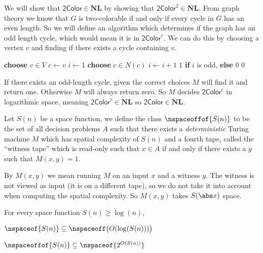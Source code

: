\documentclass[10pt]{article}
\def\twocolor{\mathsf{2Color}}
\def\NL{\mathbf{NL}}
\begin{document}
\begin{exam*}

    We will show that $\twocolor\in\NL$ by showing that $\twocolor^2\in\NL$.
    From graph theory we know that $G$ is two-colorable if and only if every cycle in $G$ has an even length.
    So we will define an algorithm which determines if the graph has an odd length cycle, which would mean it is in $\twocolor^c$.
    We can do this by choosing a vertex $v$ and finding if there exists a cycle containing $v$.

    \algorithm
            \State \textbf{choose} $v\in V$
            \State $c\gets v$
            \State $i\gets1$
                \State \textbf{choose} $c\in N(c)$
                \State $i\gets i+1$
                \Return $1$ \textbf{if} $i$ is odd, \textbf{else} $0$
            \EndWhile
            \State\Return $0$
        \EndFunc
    \ealgorithm

    If there exists an odd-length cycle, given the correct choices $M$ will find it and return one.
    Otherwise $M$ will always return zero.
    So $M$ decides $\twocolor^c$ in logarithmic space, meaning $\twocolor^c\in\NL$ so $\twocolor\in\NL$.

\end{exam*}

\begin{defn*}

    Let $S(n)$ be a space function, we define the class $\nspaceoffof{S(n)}$ to be the set of all decision problems $A$ such that there exists a \emph{deterministic} Turing machine $M$ which has spatial
    complexity of $S(n)$ and a fourth tape, called the ``witness tape'' which is read-only such that $x\in A$ if and only if there exists a $y$ such that $M(x,y)=1$.

    By $M(x,y)$ we mean running $M$ on an input $x$ and a witness $y$.
    The witness is not viewed as input (it is on a different tape), so we do not take it into account when computing the spatial complexity.
    So $M(x,y)$ takes $S(\abs x)$ space.

\end{defn*}

\begin{thrm*}

    For every space function $S(n)\geq\log(n)$,
    \benum
        \item $\nspaceof{S(n)}\subseteq\nspaceoff\bigl(O(\log(S(n)))\bigr)$
        \item $\nspaceoffof{S(n)}\subseteq\nspaceof{2^{O(S(n))}}$
    \eenum

\end{thrm*}
\end{document}
